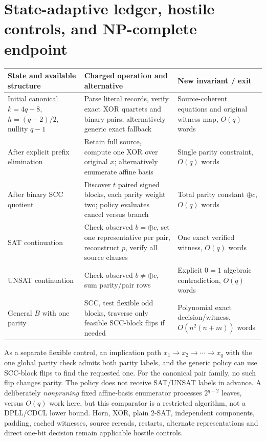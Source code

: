 \documentclass[11pt]{article}
\begin{document}
\section{State-adaptive ledger, hostile controls, and NP-complete endpoint}
\begin{center}\small
\begin{tabular}{p{.23\linewidth}p{.32\linewidth}p{.34\linewidth}}
\toprule
State and available structure & Charged operation and alternative & New invariant / exit\\\midrule
Initial canonical $k=4q-8$, $h=(q-2)/2$, nullity $q-1$ & Parse literal records, verify exact XOR quartets and binary pairs; alternatively generic exact fallback & Source-coherent equations and original witness map, $O(q)$ words\\
After explicit prefix elimination & Retain full source, compute one XOR over original $x$; alternatively enumerate affine basis & Single parity constraint, $O(q)$ words\\
After binary SCC quotient & Discover $t$ paired signed blocks, each parity weight two; policy evaluates cancel versus branch & Total parity constant $\oplus c$, $O(q)$ words\\
SAT continuation & Check observed $b=\oplus c$, set one representative per pair, reconstruct $p$, verify all source clauses & One exact verified witness, $O(q)$ words\\
UNSAT continuation & Check observed $b\ne\oplus c$, sum parity/pair rows & Explicit $0=1$ algebraic contradiction, $O(q)$ words\\
General $B$ with one parity & SCC, test flexible odd blocks, traverse only feasible SCC-block flips if needed & Polynomial exact decision/witness, $O(n^2(n+m))$ words\\
\bottomrule
\end{tabular}\end{center}
As a separate flexible control, an implication path $x_1\to x_2\to\cdots\to x_q$ with the one global parity check admits both parity labels, and the generic policy can use SCC-block flips to find the requested one. For the canonical pair family, no such flip changes parity. The policy does not receive SAT/UNSAT labels in advance. A deliberately \emph{nonpruning} fixed affine-basis enumerator processes $2^{q-2}$ leaves, versus $O(q)$ work here, but this comparator is a restricted algorithm, not a DPLL/CDCL lower bound. Horn, XOR, plain 2-SAT, independent components, padding, cached witnesses, source rereads, restarts, alternate representations and direct one-bit decision remain applicable hostile controls.
\end{document}
